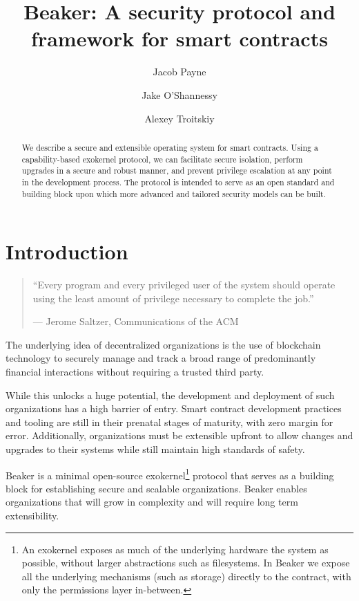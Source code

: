 \documentclass[english,a4paper]{article}
\title{Beaker: A security protocol and framework for smart
contracts}\label{beaker-a-security-protocol-and-framework-for-smart-contracts}
\author{Jacob Payne \and Jake O'Shannessy \and Alexey Troitskiy}
\begin{document}
\maketitle

\begin{abstract}\label{abstract}

We describe a secure and extensible operating system for smart contracts. Using
a capability-based exokernel protocol, we can facilitate secure isolation,
perform upgrades in a secure and robust manner, and prevent privilege escalation
at any point in the development process. The protocol is intended to serve as an open
standard and building block upon which more advanced and tailored security
models can be built.

\end{abstract}

\newpage
\tableofcontents
\newpage

\section{Introduction}\label{introduction}
\begin{quote}
``Every program and every privileged user of the system should operate
using the least amount of privilege necessary to complete the job.''

--- Jerome Saltzer, Communications of the ACM
\end{quote}

The underlying idea of decentralized organizations is the use of
blockchain technology to securely manage and track a broad range of
predominantly financial interactions without requiring a trusted third
party.

While this unlocks a huge potential, the development and deployment of such
organizations
has a high barrier of entry. Smart contract development practices and
tooling are still in their prenatal stages of maturity, with zero margin
for error. Additionally, organizations must be extensible upfront to
allow changes and upgrades to their systems while still maintain high
standards of safety.

Beaker is a minimal open-source exokernel\footnote{An exokernel exposes as much
of the underlying hardware the system as possible, without larger abstractions
such as filesystems. In Beaker we expose all the underlying mechanisms (such as
storage) directly to the contract, with only the permissions layer in-between.}
protocol that serves as a building block for establishing secure and scalable
organizations. Beaker enables organizations that will grow in complexity and
will require long term extensibility.
\end{document}
